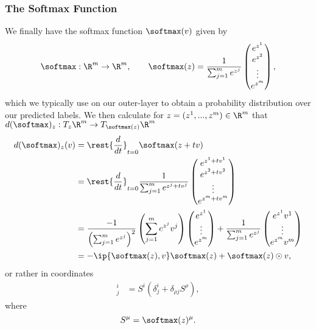 \subsubsection{The Softmax Function}
We finally have the softmax function $\softmax(v)$ given by
$$\softmax:\R^m\to\R^m,\qquad \softmax(z)=\frac{1}{\sum_{j=1}^me^{z^j}}\begin{pmatrix}
	e^{z^1}\\
	e^{z^2}\\
	\vdots\\
	e^{z^m}
\end{pmatrix},$$
which we typically use on our outer-layer to obtain a probability distribution over our predicted labels.  We then calculate for $z=(z^1,...,z^m)\in\R^m$ that $d(\softmax)_z:T_z\R^m\to T_{\softmax(z)}\R^m$
\begin{align*}
	d(\softmax)_z(v)&=\rest{\frac{d}{dt}}_{t=0}\softmax(z+tv)\\
	&=\rest{\frac{d}{dt}}_{t=0}\frac{1}{\sum_{j=1}^me^{z^j+tv^j}}\begin{pmatrix}
		e^{z^1+tv^1}\\
		e^{z^2+tv^2}\\
		\vdots\\
		e^{z^m+tv^m}
	\end{pmatrix}\\
	&=\frac{-1}{\left(\sum_{j=1}^me^{z^j}\right)^2}\left(\sum_{j=1}^me^{z^j}v^j\right)\begin{pmatrix}
		e^{z^1}\\
		\vdots\\
		e^{z^m}
	\end{pmatrix}+\frac{1}{\sum_{j=1}^me^{z^j}}\begin{pmatrix}
		e^{z^1}v^1\\
		\vdots\\
		e^{z^m}v^m
	\end{pmatrix}\\
	&=-\ip{\softmax(z),v}\softmax(z)+\softmax(z)\odot v,
\end{align*}
or rather in coordinates
\begin{align*}
	[d(\softmax)_z]^i_j&=S^i(\delta^i_j+\delta_{\rho j}S^\rho),
\end{align*}
where
$$S^\mu=\softmax(z)^\mu.$$





